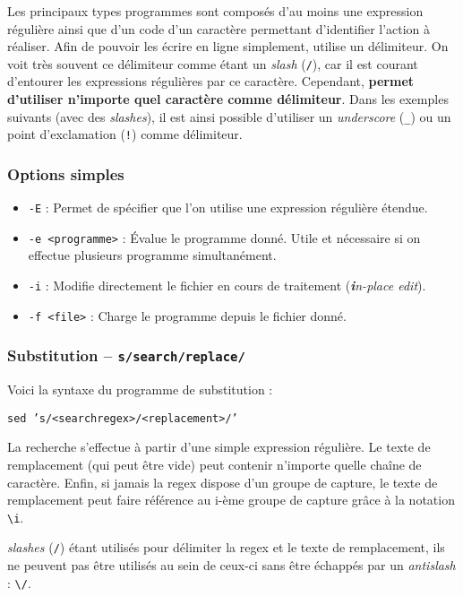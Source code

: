 Les principaux types programmes  sont composés d'au moins une expression régulière ainsi que d'un code d'un caractère permettant d'identifier l'action à réaliser. Afin de pouvoir les écrire en ligne simplement,  utilise un délimiteur. On voit très souvent ce délimiteur comme étant un \textit{slash} (\texttt{/}), car il est courant d'entourer les expressions régulières par ce caractère. Cependant, \textbf{ permet d'utiliser n'importe quel caractère comme délimiteur}. Dans les exemples suivants (avec des \textit{slashes}), il est ainsi possible d'utiliser un \textit{underscore} (\texttt{\_}) ou un point d'exclamation (\texttt{!}) comme délimiteur.

\subsubsection{Options simples}
\begin{itemize}
    \item \texttt{-E} : Permet de spécifier que l'on utilise une expression régulière étendue.
    \item \texttt{-e <programme>} : Évalue le programme donné. Utile et nécessaire si on effectue plusieurs programme simultanément.
    \item \texttt{-i} : Modifie directement le fichier en cours de traitement (\textit{\textbf{i}n-place edit}).
    \item \texttt{-f <file>} : Charge le programme  depuis le fichier donné.
\end{itemize}

\subsubsection{Substitution -- \texttt{s/search/replace/}}

Voici la syntaxe du programme de substitution :
\begin{nscenter}
\texttt{sed 's/<searchregex>/<replacement>/'}
\end{nscenter}

La recherche s'effectue à partir d'une simple expression régulière. Le texte de remplacement (qui peut être vide) peut contenir n'importe quelle chaîne de caractère. Enfin, si jamais la regex dispose d'un groupe de capture, le texte de remplacement peut faire référence au i-ème groupe de capture grâce à la notation \texttt{\textbackslash i}.

 \textit{slashes} (\texttt{/}) étant utilisés pour délimiter la regex et le texte de remplacement, ils ne peuvent pas être utilisés au sein de ceux-ci sans être échappés par un \textit{antislash} : \texttt{\textbackslash /}.

